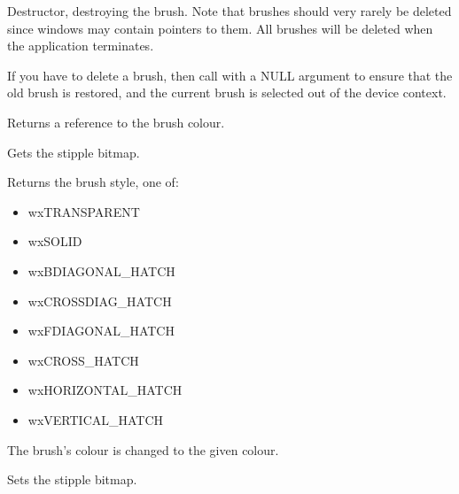 
Destructor, destroying the brush. Note that brushes should very rarely
be deleted since windows may contain pointers to them. All brushes
will be deleted when the application terminates.

If you have to delete a brush, then call
 with a NULL argument to ensure that
the old brush is restored, and the current brush is selected out of the
device context.



Returns a reference to the brush colour.



Gets the stipple bitmap.



Returns the brush style, one of:

\begin{itemize}\itemsep=0pt
\item wxTRANSPARENT
\item wxSOLID
\item wxBDIAGONAL\_HATCH
\item wxCROSSDIAG\_HATCH
\item wxFDIAGONAL\_HATCH
\item wxCROSS\_HATCH
\item wxHORIZONTAL\_HATCH
\item wxVERTICAL\_HATCH
\end{itemize}





The brush's colour is changed to the given colour.



Sets the stipple bitmap.

